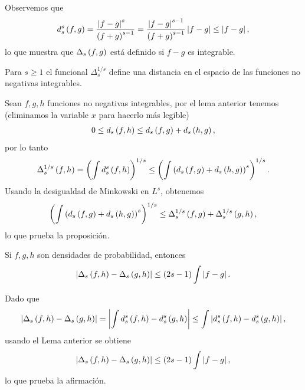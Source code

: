 Observemos que
\begin{align*}
d_{s}^{s}\left( f,g \right) = \frac{\left| f - g \right|^{s}\ \ \ }{\left( f + g \right)^{s-1}} 
= \frac{\left| f - g \right|^{s-1}}{\left( f + g \right)^{s-1}}\left| f - g \right| \le \left| f - g \right|,
\end{align*}
lo que muestra que $\Delta_{s}\left( f,g \right)$ está definido si $f-g$ es integrable.
\begin{proposition}
	Para $s \ge 1$ el funcional $\Delta_{s}^{1/s}$ define una distancia en el espacio de las funciones no negativas integrables.
\end{proposition}
\begin{dem}
	Sean $f,g,h$ funciones no negativas integrables, por el lema anterior tenemos (eliminamos la variable $x$
	para hacerlo más legible)
	\begin{align*}
	0 \le d_{s}\left( f,h \right) \le d_{s}\left( f,g \right) + d_{s}\left( h,g \right),
	\end{align*}
	por lo tanto
	\begin{align*}
	\Delta_{s}^{1/s}\left( f,h \right) = \left( \int d_{s}^{s}\left( f,h \right) \right)^{1/s} \le 
	\left( \int \left( d_{s}\left( f,g \right) + d_{s}\left( h,g \right) \right)^{s} \right)^{1/s}.
	\end{align*}
	Usando la desigualdad de Minkowski en $L^{s}$, obtenemos
	\begin{align*}
	\left( \int \left( d_{s}\left( f,g \right) + d_{s}\left( h,g \right) \right)^{s} \right)^{1/s} \le 
	\Delta_{s}^{1/s}\left( f,g \right) + \Delta_{s}^{1/s}\left( g,h \right),
	\end{align*}
	lo que prueba la proposición.
\end{dem}
\begin{proposition}
	Si $f,g,h$ son densidades de probabilidad, entonces
	\begin{align*}
	\left| \Delta_{s}\left( f,h \right)-\Delta_{s}\left( g,h \right) \right| \le \left( 2s-1 \right) \int \left| f - g \right|.
	\end{align*}
\end{proposition}
\begin{dem}
	Dado que
	\begin{align*}
	\left| \Delta_{s}\left( f,h \right)-\Delta_{s}\left( g,h \right) \right| = \left| \int d_{s}^{s}\left( f,h \right) - d_{s}^{s}\left( g,h \right) \right|
	\le \int \left| d_{s}^{s}\left( f,h \right) - d_{s}^{s}\left( g,h \right) \right|,
	\end{align*}
	usando el Lema anterior se obtiene
	\begin{align*}
	\left| \Delta_{s}\left( f,h \right)-\Delta_{s}\left( g,h \right) \right| \le \left( 2s-1 \right) \int \left| f - g \right|,
	\end{align*}
	lo que prueba la afirmación.
\end{dem}



